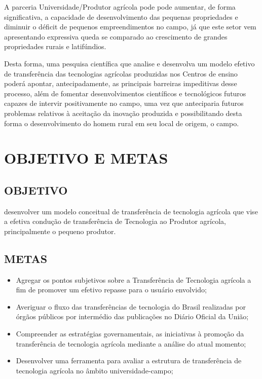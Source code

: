 A parceria Universidade/Produtor agrícola pode pode aumentar, de forma
significativa, a capacidade de desenvolvimento das pequenas propriedades e diminuir o déficit de pequenos empreendimentos no campo, já que este setor vem apresentando expressiva queda se comparado ao crescimento de grandes propriedades rurais e latifúndios. 



Desta forma, uma pesquisa científica que analise e desenvolva um modelo efetivo de transferência das tecnologias agrícolas produzidas nos Centros de ensino poderá apontar, antecipadamente, as principais barreiras impeditivas desse processo, além de fomentar desenvolvimentos científicos e tecnológicos futuros capazes de intervir positivamente no campo, uma vez que anteciparia futuros problemas relativos à aceitação da inovação produzida e possibilitando desta forma o desenvolvimento do homem rural em seu local de origem, o campo.

\section{OBJETIVO E METAS}

\subsection{OBJETIVO}
desenvolver um modelo conceitual de transferência de tecnologia agrícola que vise a efetiva condução de transferência de Tecnologia ao Produtor agrícola, principalmente o pequeno produtor.
\subsection{METAS}

\begin{itemize}
\item{Agregar os pontos subjetivos sobre a Transferência de Tecnologia agrícola a fim de promover um efetivo repasse para o usuário envolvido;}
\item {Averiguar o fluxo das transferências de tecnologia do Brasil realizadas por órgãos públicos por intermédio das publicações no Diário Oficial da União;}
\item {Compreender as estratégias governamentais, as iniciativas à promoção da transferência de tecnologia agrícola mediante a análise do atual momento;}
\item {Desenvolver uma ferramenta para avaliar a estrutura de transferência de
tecnologia agrícola no âmbito universidade-campo;}
\end{itemize}


